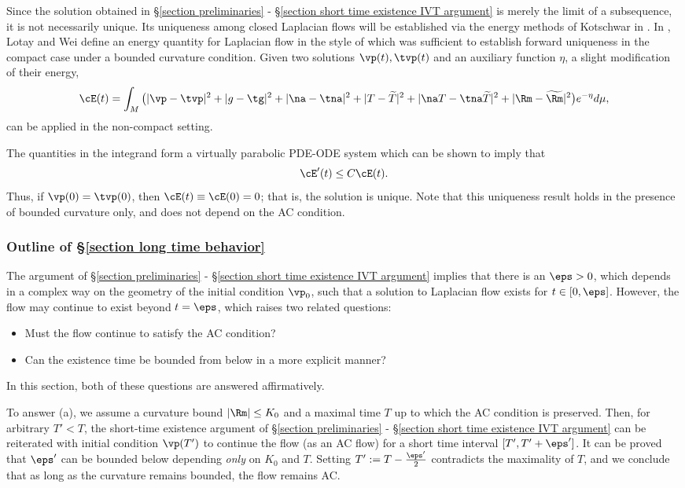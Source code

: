 \documentclass[hidelinks, 12pt, oneside, reqno]{amsart}
\begin{document}
Since the solution obtained in \S \ref{section preliminaries} - \S \ref{section short time existence IVT argument} is merely the limit of a subsequence, it is not necessarily unique. Its uniqueness among closed Laplacian flows will be established via the energy methods of Kotschwar in \cite{kotschwarEnergy}. In \cite{LotayWeiLaplacianFlow}, Lotay and Wei define an energy quantity for Laplacian flow in the style of \cite{kotschwarEnergy} which was sufficient to establish forward uniqueness in the compact case under a bounded curvature condition. Given two solutions $\vp(t), \tvp(t)$ and an auxiliary function $\eta$, a slight modification of their energy,
\[
\cE (t) = \int_M \big( |\vp - \tvp|^2 + |g-\tg|^2 + |\na - \tna|^2 + |T - \widetilde{T}|^2 + |\na T - \tna \widetilde{T}|^2 + |\Rm - \widetilde{\Rm}|^2 \big) e^{-\eta} d\mu,
\]
can be applied in the non-compact setting. 

The quantities in the integrand form a virtually parabolic PDE-ODE system which can be shown to imply that 
\[
\cE'(t) \le C \cE (t).
\]
Thus, if $\vp(0) = \tvp(0)$, then $\cE(t) \equiv \cE(0) = 0$; that is, the solution is unique. Note that this uniqueness result holds in the presence of bounded curvature only, and does not depend on the AC condition. 

\subsubsection{Outline of \S \ref{section long time behavior}} 

The argument of \S \ref{section preliminaries} - \S \ref{section short time existence IVT argument} implies that there is an $\eps > 0$, which depends in a complex way on the geometry of the initial condition $\vp_0$, such that a solution to Laplacian flow exists for $t \in [0, \eps]$. However, the flow may continue to exist beyond $t = \eps$, which raises two related questions: 
\begin{itemize}
    \item[(a)] Must the flow continue to satisfy the AC condition?
    \item[(b)] Can the existence time be bounded from below in a more explicit manner?
\end{itemize}
In this section, both of these questions are answered affirmatively. 

To answer (a), we assume a curvature bound $|\Rm| \le K_0$ and a maximal time $T$ up to which the AC condition is preserved. Then, for arbitrary $T' < T$, the short-time existence argument of \S \ref{section preliminaries} - \S \ref{section short time existence IVT argument} can be reiterated with initial condition $\vp(T')$ to continue the flow (as an AC flow) for a short time interval $[T', T' + \eps']$. It can be proved that $\eps'$ can be bounded below depending \textit{only} on $K_0$ and $T$. Setting $T' := T - \tfrac{\eps'}{2}$ contradicts the maximality of $T$, and we conclude that as long as the curvature remains bounded, the flow remains AC.
\end{document}
